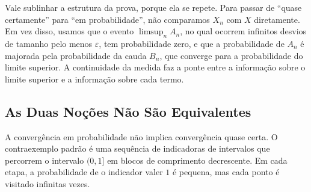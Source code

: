\documentclass[12pt,portuguese]{article}
\theoremstyle{definition}
\theoremstyle{plainexercise}
\theoremstyle{starredexercise}
\theoremstyle{definition}
\begin{document}
Vale sublinhar a estrutura da prova, porque ela se repete. Para passar de
``quase certamente'' para ``em probabilidade'', não comparamos $X_n$ com $X$
diretamente. Em vez disso, usamos que o evento $\limsup_n A_n$, no qual ocorrem
infinitos desvios de tamanho pelo menos $\varepsilon$, tem probabilidade zero,
e que a probabilidade de $A_n$ é majorada pela probabilidade da cauda $B_n$,
que converge para a probabilidade
do limite superior. A continuidade da medida faz a ponte entre a informação
sobre o limite superior e a informação sobre cada termo.

\subsection{As Duas Noções Não São Equivalentes}
\label{subsec:typewriter}

A convergência em probabilidade não implica convergência quase certa. O
contraexemplo padrão é uma sequência de indicadoras de intervalos que percorrem
o intervalo $(0,1]$ em blocos de comprimento decrescente. Em cada etapa, a
probabilidade de o indicador valer $1$ é pequena, mas cada ponto é visitado
infinitas vezes.
\end{document}
